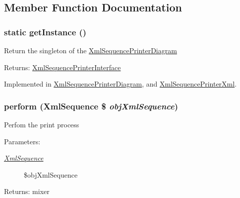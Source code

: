 \subsection{Member Function Documentation}
\hypertarget{interface_xml_sequence_printer_interface_c93fbec81f07e5d15f80db907e63dc10}{
\subsubsection[{getInstance}]{\setlength{\rightskip}{0pt plus 5cm}static getInstance ()}}
\label{interface_xml_sequence_printer_interface_c93fbec81f07e5d15f80db907e63dc10}


Return the singleton of the \hyperlink{class_xml_sequence_printer_diagram}{XmlSequencePrinterDiagram}

\begin{Desc}
\item[Returns:]\hyperlink{interface_xml_sequence_printer_interface}{XmlSequencePrinterInterface} \end{Desc}


Implemented in \hyperlink{class_xml_sequence_printer_diagram_c93fbec81f07e5d15f80db907e63dc10}{XmlSequencePrinterDiagram}, and \hyperlink{class_xml_sequence_printer_xml_c93fbec81f07e5d15f80db907e63dc10}{XmlSequencePrinterXml}.\hypertarget{interface_xml_sequence_printer_interface_7a8a4630e9f25847da0a6de87a5ab7e0}{
\subsubsection[{perform}]{\setlength{\rightskip}{0pt plus 5cm}perform ({\bf XmlSequence} \$ {\em objXmlSequence})}}
\label{interface_xml_sequence_printer_interface_7a8a4630e9f25847da0a6de87a5ab7e0}


Perfom the print process

\begin{Desc}
\item[Parameters:]
\begin{description}
\item[{\em \hyperlink{class_xml_sequence}{XmlSequence}}]\$objXmlSequence \end{description}
\end{Desc}
\begin{Desc}
\item[Returns:]mixer \end{Desc}


